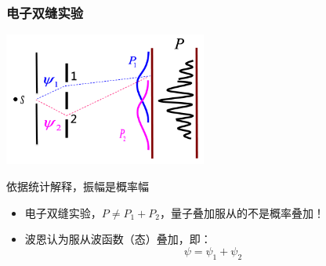\begin{frame}
    \frametitle{电子双缝实验}
    \begin{center}
        \includegraphics[width=0.5\textwidth]{figs/sup-3.png} \\
    \end{center} 
    依据统计解释，振幅是概率幅\\
    \begin{itemize}
        \item 电子双缝实验，$P\neq P_1+P_2 $，量子叠加服从的不是概率叠加！
        \item 波恩认为服从波函数（态）叠加，即：
        $$ \psi =\psi_1+\psi_2$$
    \end{itemize}
\end{frame} 


